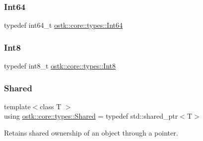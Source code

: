 \mbox{\label{namespaceostk_1_1core_1_1types_ad98fda0b92ffe48abffa77d65cb42113}} 
\subsubsection{\texorpdfstring{Int64}{Int64}}
{\footnotesize\ttfamily typedef int64\+\_\+t \hyperlink{namespaceostk_1_1core_1_1types_ad98fda0b92ffe48abffa77d65cb42113}{ostk\+::core\+::types\+::\+Int64}}

\mbox{\label{namespaceostk_1_1core_1_1types_ad9a0dc0d53ae20e4a53ab8a250d56de3}} 
\subsubsection{\texorpdfstring{Int8}{Int8}}
{\footnotesize\ttfamily typedef int8\+\_\+t \hyperlink{namespaceostk_1_1core_1_1types_ad9a0dc0d53ae20e4a53ab8a250d56de3}{ostk\+::core\+::types\+::\+Int8}}

\mbox{\label{namespaceostk_1_1core_1_1types_a3e7aff47b81452ed1f18f6d8f6c90140}} 
\subsubsection{\texorpdfstring{Shared}{Shared}}
{\footnotesize\ttfamily template$<$class T $>$ \\
using \hyperlink{namespaceostk_1_1core_1_1types_a3e7aff47b81452ed1f18f6d8f6c90140}{ostk\+::core\+::types\+::\+Shared} = typedef std\+::shared\+\_\+ptr$<$T$>$}



Retains shared ownership of an object through a pointer. 

\mbox{\label{namespaceostk_1_1core_1_1types_acf68f214a245e35a7c1994c84dc56746}} 
